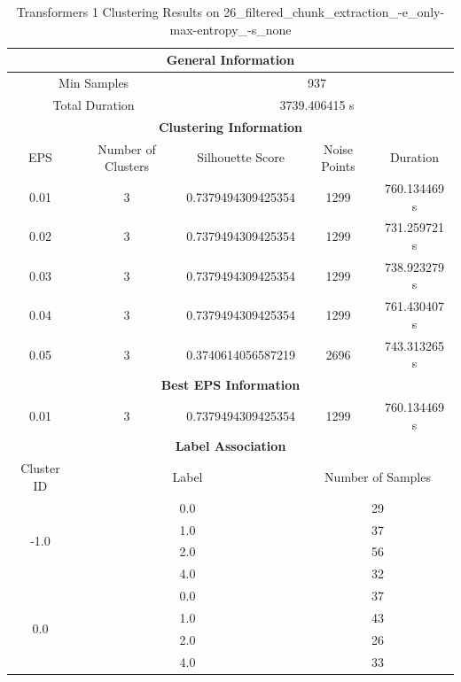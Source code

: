 \begin{longtable}{|c|c|c|c|c|}
\caption{Transformers 1 Clustering Results on 26\_filtered\_chunk\_extraction\_-e\_only-max-entropy\_-s\_none} \label{tab:26_filtered_chunk_extraction_-e_only-max-entropy_-s_none_transformers_1_clustering_results}\\
\hline
\multicolumn{5}{|c|}{\textbf{General Information}} \\
\hline
\multicolumn{2}{|c|}{Min Samples} & \multicolumn{3}{c|}{937} \\
\multicolumn{2}{|c|}{Total Duration} & \multicolumn{3}{c|}{3739.406415 s} \\
\hline
\multicolumn{5}{|c|}{\textbf{Clustering Information}} \\
\hline
EPS & Number of Clusters & Silhouette Score & Noise Points & Duration \\
0.01 & 3 & 0.7379494309425354 & 1299 & 760.134469 s\\
0.02 & 3 & 0.7379494309425354 & 1299 & 731.259721 s\\
0.03 & 3 & 0.7379494309425354 & 1299 & 738.923279 s\\
0.04 & 3 & 0.7379494309425354 & 1299 & 761.430407 s\\
0.05 & 3 & 0.3740614056587219 & 2696 & 743.313265 s\\
\hline
\multicolumn{5}{|c|}{\textbf{Best EPS Information}} \\
\hline
0.01 & 3 & 0.7379494309425354 & 1299 & 760.134469 s\\
\hline
\multicolumn{5}{|c|}{\textbf{Label Association}} \\
\hline
Cluster ID & \multicolumn{2}{c|}{Label} & \multicolumn{2}{c|}{Number of Samples} \\
\hline
\multirow{4}{*}{-1.0} & \multicolumn{2}{c|}{0.0} & \multicolumn{2}{c|}{29} \\
& \multicolumn{2}{c|}{1.0} & \multicolumn{2}{c|}{37} \\
& \multicolumn{2}{c|}{2.0} & \multicolumn{2}{c|}{56} \\
& \multicolumn{2}{c|}{4.0} & \multicolumn{2}{c|}{32} \\
\hline
\multirow{4}{*}{0.0} & \multicolumn{2}{c|}{0.0} & \multicolumn{2}{c|}{37} \\
& \multicolumn{2}{c|}{1.0} & \multicolumn{2}{c|}{43} \\
& \multicolumn{2}{c|}{2.0} & \multicolumn{2}{c|}{26} \\
& \multicolumn{2}{c|}{4.0} & \multicolumn{2}{c|}{33} \\

\end{longtable}

